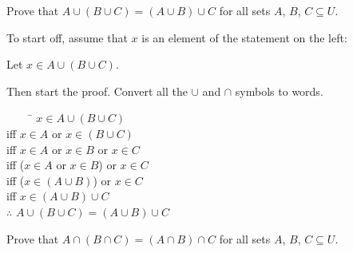 \documentclass[\main/notes.tex]{subfiles}
\begin{document}
			\begin{example}
				\begin{questions}[before=\raggedright]
					\item Prove that $A \cup (B \cup C) = (A \cup B) \cup C$ for all sets $A$, $B$, $C \subseteq U$.\\
						\begin{answer}
							\begin{minipage}{0.6\textwidth}
								To start off, assume that $x$ is an element of the statement on the left:
								\begin{indentparagraph}
									Let $x \in A \cup (B \cup C)$.
								\end{indentparagraph}
								Then start the proof. Convert all the $\cup$ and $\cap$ symbols to words.
								\begin{indentparagraph}
									\begin{tabbing}
										$\qquad$ \= $x \in A \cup (B \cup C)$\\
										iff \> $x \in A$ or $x \in (B \cup C)$\\
										iff \> $x \in A$ or $x \in B$ or $x \in C$\\
										iff \> ($x \in A$ or $x \in B$) or $x \in C$\\
										iff \> ($x \in (A \cup B)$) or $x \in C$\\
										iff \> $x \in (A \cup B) \cup C$\\
										$\therefore$ \> $A \cup (B \cup C) = (A \cup B) \cup C$
									\end{tabbing}
								\end{indentparagraph}
							\end{minipage}
							\begin{minipage}{0.33\textwidth}
								\begin{center}
									\begin{vennthree}[][]
										\fillA
										\fillB
										\fillC
									\end{vennthree}
								\end{center}
							\end{minipage}
						\end{answer}
						\item Prove that $A \cap (B \cap C) = (A \cap B) \cap C$ for all sets $A$, $B$, $C \subseteq U$.\\
							\begin{answer}
								\begin{minipage}{0.6\textwidth}

\end{minipage}
\end{answer}
\end{questions}
\end{example}
\end{document}
